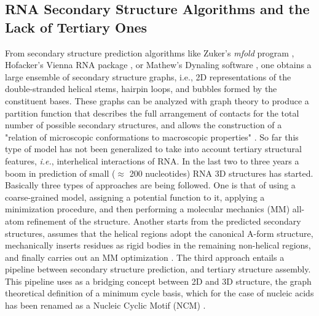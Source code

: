 \subsection{RNA Secondary Structure Algorithms and the Lack of Tertiary Ones}
From   secondary   structure   prediction  algorithms   like   Zuker's
\textit{mfold} program \cite{zuker2003}, Hofacker's Vienna RNA package
\cite{hofacker1994}, or Mathew's Dynaling software \cite{mathews2002},
one obtains a  large ensemble of secondary structure  graphs, i.e., 2D
representations of  the double-stranded helical  stems, hairpin loops,
 and bubbles formed by the constituent bases.  These graphs can be analyzed
with graph  theory to produce  a partition function that describes the
full arrangement  of contacts for  the total  number of  possible secondary
structures, and allows  the construction  of a "relation  of microscopic
conformations to macroscopic  properties" \cite{chen2000}. So far this
type of model  has not been generalized to  take into account tertiary
structural features, \textit{i.e.},  interhelical interactions of RNA.
In  the  last  two to  three  years  a  boom  in prediction  of  small
($\approx$ 200  nucleotides) RNA 3D structures  has started. Basically
three types of approaches are being  followed.  One is that of using a
coarse-grained model, assigning a potential function to it, applying a
minimization procedure, and then performing a molecular mechanics (MM)
all-atom  refinement \cite{das2007, ding2008,  jonikas2009a} of the structure.  Another
starts  from  the predicted  secondary  structures,  assumes that  the
helical  regions adopt  the canonical  A-form  structure, mechanically
inserts residues as rigid bodies in the remaining non-helical regions,
and finally  carries out an MM  optimization \cite{martinez2008}.  The
third  approach   entails  a  pipeline   between  secondary  structure
prediction, and tertiary structure  assembly.  This pipeline uses as a
bridging concept  between 2D and  3D structure, the  graph theoretical
definition of  a minimum  cycle basis, which  for the case  of nucleic
acids   has   been  renamed   as   a   Nucleic   Cyclic  Motif   (NCM)
\cite{parisien2008}.

